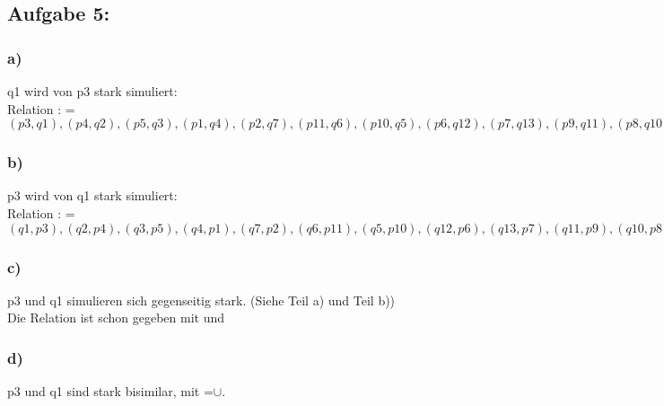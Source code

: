 \documentclass[10pt,a4paper,german,landscape]{article} \usepackage[utf8]{inputenc} %
\begin{document}
\subsection*{Aufgabe 5:}
\subsubsection*{a)}
q1 wird von p3 stark simuliert:\\
Relation : =${(p3,q1),(p4,q2),(p5,q3),(p1,q4),(p2,q7),(p11,q6),(p10,q5),(p6,q12),(p7,q13),(p9,q11),(p8,q10),(p9,q9),(p8,q8)}$
\subsubsection*{b)}
p3 wird von q1 stark simuliert:\\
Relation : =${(q1,p3),(q2,p4),(q3,p5),(q4,p1),(q7,p2),(q6,p11),(q5,p10),(q12,p6),(q13,p7),(q11,p9),(q10,p8),(q9,p9),(q8,p8)}$
\subsubsection*{c)}
p3 und q1 simulieren sich gegenseitig stark. (Siehe Teil a) und Teil b)) \\
Die Relation ist schon gegeben mit  und 
\subsubsection*{d)}
p3 und q1 sind stark bisimilar, mit =$\cup$.
\end{document}
